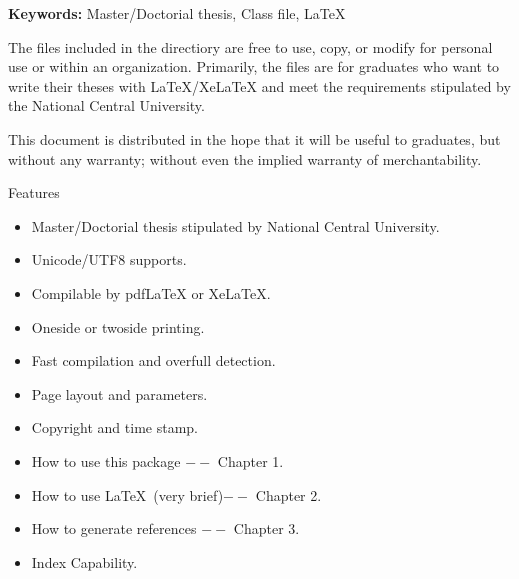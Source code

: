 \begin{abstracten}

{\bf \sf Keywords:} Master/Doctorial thesis, Class file, \LaTeX

\vspace{2em}

The files included in the directiory are free to use, copy, or modify for personal use or within an organization. Primarily, the files are for graduates who want to write their theses with \LaTeX/Xe\LaTeX{} and meet the requirements stipulated by the National Central University.

This document is distributed in the hope that it will be useful to graduates, but without any warranty; without even the implied warranty of merchantability.
\begin{center}
Features
\begin{itemize}
\item Master/Doctorial thesis stipulated by National Central University. 
\item Unicode/UTF8 supports.
\item Compilable by pdf\LaTeX{ } or Xe\LaTeX. 
\item Oneside or twoside printing.
\item Fast compilation and overfull detection. 
\item Page layout and parameters.
\item Copyright and time stamp.
\item How to use this package $--$ Chapter 1.
\item How to use \LaTeX\ (very brief)$--$ Chapter 2.
\item How to generate references $--$ Chapter 3.
\item Index Capability.
\end{itemize}
\end{center}
\end{abstracten} 

